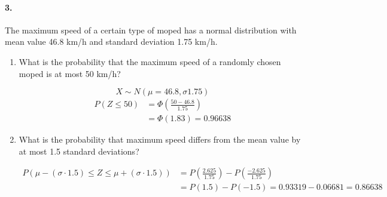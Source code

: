    \paragraph*{3.}
    The maximum speed of a certain type of moped has a normal distribution with mean value 46.8 km/h and standard deviation 1.75 km/h.

    \begin{enumerate}[label=(\alph*)]
        \item What is the probability that the maximum speed of a randomly chosen moped is at most 50 km/h?
        \\
        \begin{mdframed}
            \begin{equation*}
                X \sim N(\mu=46.8, \sigma 1.75)
            \end{equation*}
            \begin{align*}
                P(Z \leq 50)    & = \Phi\left(\frac{50-46.8}{1.75}\right)       \\
                                & = \Phi(1.83) = \boxed{0.96638}
            \end{align*}
        \end{mdframed}

        \item What is the probability that maximum speed differs from the mean value by at most 1.5 standard deviations?
        \\
        \begin{mdframed}
            \begin{align*}
                P(\mu - (\sigma \cdot 1.5) \leq Z \leq \mu + (\sigma \cdot 1.5))             
                & = P\left(\frac{2.625}{1.75}\right) - P\left(\frac{-2.625}{1.75}\right) \\
                & = P(1.5) - P(-1.5) = 0.93319 - 0.06681 = \boxed{0.86638}
            \end{align*}
        \end{mdframed}
    \end{enumerate}

